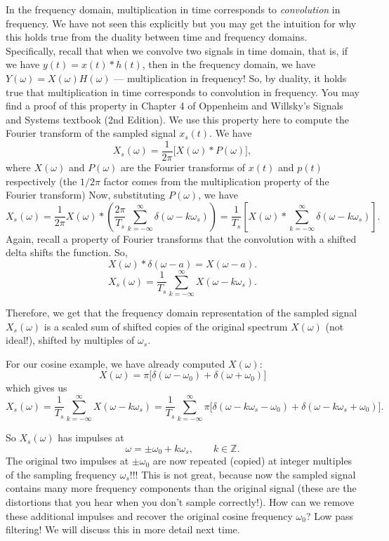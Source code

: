 In the frequency domain, multiplication in time corresponds to \emph{convolution} in frequency. We have not seen this explicitly but you may get the intuition for why this holds true from the duality between time and frequency domains. Specifically, recall that when we convolve two signals in time domain, that is, if we have $y(t) = x(t) * h(t)$, then in the frequency domain, we have $Y(\omega) = X(\omega)H(\omega)$ --- multiplication in frequency! So, by duality, it holds true that multiplication in time corresponds to convolution in frequency. You may find a proof of this property in Chapter 4 of Oppenheim and Willsky's Signals and Systems textbook (2nd Edition). We use this property here to compute the Fourier transform of the sampled signal $x_s(t)$. We have 
\[
X_s(\omega) = \frac{1}{2\pi} \bigl[X(\omega) * P(\omega)\bigr],
\]
where $X(\omega)$ and $P(\omega)$ are the Fourier transforms of $x(t)$ and $p(t)$ respectively (the $1/2\pi$ factor comes from the multiplication property of the Fourier transform) Now, substituting $P(\omega)$, we have
\[
X_s(\omega)
= \frac{1}{2\pi} X(\omega) * \left( \frac{2\pi}{T_s} \sum_{k=-\infty}^{\infty}
\delta(\omega - k\omega_s) \right)
= \frac{1}{T_s} \left[ X(\omega) * \sum_{k=-\infty}^{\infty} \delta(\omega - k\omega_s) \right].
\]
Again, recall a property of Fourier transforms that the convolution with a shifted delta shifts the function. So, 
\[
X(\omega) * \delta(\omega - a) = X(\omega - a).
\]
\[
X_s(\omega)
= \frac{1}{T_s} \sum_{k=-\infty}^{\infty} X(\omega - k\omega_s).
\]

Therefore, we get that the frequency domain representation of the sampled signal $X_s(\omega)$ is
a scaled sum of shifted copies of the original spectrum $X(\omega)$ (not ideal!), shifted
by multiples of $\omega_s$.

For our cosine example, we have already computed $X(\omega)$:
\[
X(\omega) = \pi\bigl[\delta(\omega-\omega_0) + \delta(\omega+\omega_0)\bigr]
\]
which gives us 
\[
X_s(\omega)
= \frac{1}{T_s} \sum_{k=-\infty}^{\infty} X(\omega - k\omega_s)
= \frac{1}{T_s} \sum_{k=-\infty}^{\infty}
\pi\bigl[\delta(\omega - k\omega_s - \omega_0)
       + \delta(\omega - k\omega_s + \omega_0)\bigr].
\]

So $X_s(\omega)$ has impulses at
\[
\omega = \pm\omega_0 + k\omega_s, \qquad k \in \mathbb{Z}.
\]
The original two impulses at $\pm\omega_0$ are now repeated (copied) at integer multiples
of the sampling frequency $\omega_s$!!! This is not great, because now the sampled
signal contains many more frequency components than the original signal (these are the distortions that you hear when you don't sample correctly!). How can we remove these additional impulses and recover the original cosine frequency $\omega_0$? Low pass filtering! We will discuss this in more detail next time. 

